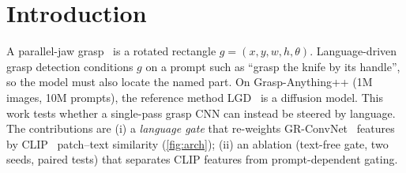 \section{Introduction}
A parallel-jaw grasp~\cite{jiang2011efficient} is a rotated rectangle $g=(x,y,w,h,\theta)$. Language-driven grasp detection conditions $g$ on a prompt such as ``grasp the knife by its handle'', so the model must also locate the named part. On Grasp-Anything++ (1M images, 10M prompts), the reference method LGD~\cite{vuong2024language} is a diffusion model. This work tests whether a single-pass grasp CNN can instead be steered by language. The contributions are (i) a \emph{language gate} that re-weights GR-ConvNet~\cite{kumra2020antipodal} features by CLIP~\cite{radford2021learning} patch--text similarity (\cref{fig:arch}); (ii) an ablation (text-free gate, two seeds, paired tests) that separates CLIP features from prompt-dependent gating.
